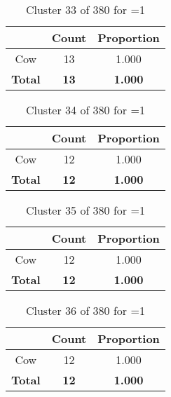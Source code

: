 \begin{table}[ht!]
\centering
\begin{tabular}{|c|c|c|}
\hline
\bf \Spec{} &\bf Count &\bf Proportion\\ \hline \hline
Cow & 13 & 1.000\\ \hline
\hline
\bf Total & \bf 13 & \bf 1.000\\ \hline
\end{tabular}
\label{tab:cluster:33:1}
\caption{Cluster 33 of 380 for \minneigh{}=1}
\end{table}

\begin{table}[ht!]
\centering
\begin{tabular}{|c|c|c|}
\hline
\bf \Spec{} &\bf Count &\bf Proportion\\ \hline \hline
Cow & 12 & 1.000\\ \hline
\hline
\bf Total & \bf 12 & \bf 1.000\\ \hline
\end{tabular}
\label{tab:cluster:34:1}
\caption{Cluster 34 of 380 for \minneigh{}=1}
\end{table}

\begin{table}[ht!]
\centering
\begin{tabular}{|c|c|c|}
\hline
\bf \Spec{} &\bf Count &\bf Proportion\\ \hline \hline
Cow & 12 & 1.000\\ \hline
\hline
\bf Total & \bf 12 & \bf 1.000\\ \hline
\end{tabular}
\label{tab:cluster:35:1}
\caption{Cluster 35 of 380 for \minneigh{}=1}
\end{table}

\begin{table}[ht!]
\centering
\begin{tabular}{|c|c|c|}
\hline
\bf \Spec{} &\bf Count &\bf Proportion\\ \hline \hline
Cow & 12 & 1.000\\ \hline
\hline
\bf Total & \bf 12 & \bf 1.000\\ \hline
\end{tabular}
\label{tab:cluster:36:1}
\caption{Cluster 36 of 380 for \minneigh{}=1}
\end{table}

